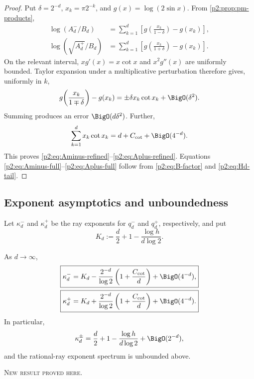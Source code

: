 \documentclass[11pt,oneside]{article}
\theoremstyle{definition}
\theoremstyle{remark}
\newcommand{\newresult}{\textcolor{newgreen}{\textsc{New result proved here.}}}
\begin{document}
\begin{proof}
Put $\delta=2^{-d}$, $x_k=\pi2^{-k}$, and $g(x)=\log(2\sin x)$. From
\cref{p2:prop:pm-products},
\begin{align*}
 \log(A_d^-/B_d)
 &=\sum_{k=1}^{d}\left[g\!\left(\frac{x_k}{1-\delta}\right)-g(x_k)\right],\\
 \log(\sqrt{A_d^+}/B_d)
 &=\sum_{k=1}^{d}\left[g\!\left(\frac{x_k}{1+\delta}\right)-g(x_k)\right].
\end{align*}
On the relevant interval, $xg'(x)=x\cot x$ and $x^2g''(x)$ are uniformly bounded.
Taylor expansion under a multiplicative perturbation therefore gives, uniformly in
$k$,
\[
 g\!\left(\frac{x_k}{1\mp\delta}\right)-g(x_k)
 =\pm\delta x_k\cot x_k+\BigO(\delta^2).
\]
Summing produces an error $\BigO(d\delta^2)$. Further,
\[
 \sum_{k=1}^{d}x_k\cot x_k
 =d+C_{\cot}+\BigO(4^{-d}).
\]
This proves \eqref{p2:eq:Aminus-refined}--\eqref{p2:eq:Aplus-refined}. Equations
\eqref{p2:eq:Aminus-full}--\eqref{p2:eq:Aplus-full} follow from
\eqref{p2:eq:B-factor} and \eqref{p2:eq:Hd-tail}.
\end{proof}

\subsection{Exponent asymptotics and unboundedness}

Let $\kappa_d^-$ and $\kappa_d^+$ be the ray exponents for $q_d^-$ and $q_d^+$,
respectively, and put
\begin{equation}
 K_d:=\frac d2+1-\frac{\log h}{d\log2}.
 \label{p2:eq:Kd}
\end{equation}

\begin{corollary}\label{p2:cor:pm-kappa}
As $d\to\infty$,
\begin{align}
 \boxed{
 \kappa_d^-=K_d-\frac{2^{-d}}{\log2}
 \left(1+\frac{C_{\cot}}d\right)+\BigO(4^{-d}),}
 \label{p2:eq:kminus-asymptotic}\\
 \boxed{
 \kappa_d^+=K_d+\frac{2^{-d}}{\log2}
 \left(1+\frac{C_{\cot}}d\right)+\BigO(4^{-d}).}
 \label{p2:eq:kplus-asymptotic}
\end{align}
In particular,
\begin{equation}
 \kappa_d^{\pm}=\frac d2+1-\frac{\log h}{d\log2}+\BigO(2^{-d}),
 \label{p2:eq:kpm-main}
\end{equation}
and the rational-ray exponent spectrum is unbounded above.

\smallskip\noindent\newresult
\end{corollary}
\end{document}
